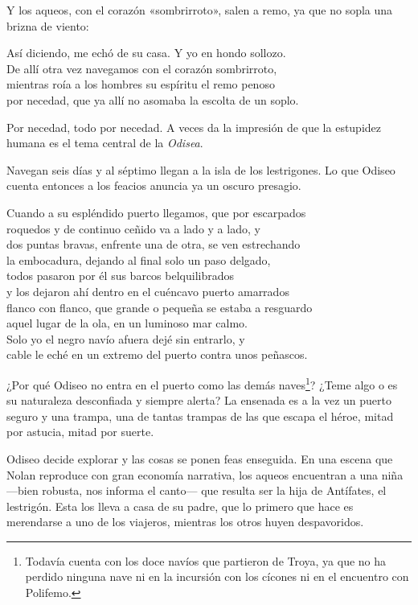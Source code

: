 Y los aqueos, con el corazón «sombrirroto», salen a remo, ya que no sopla una brizna de viento:

\begin{versocita}
Así diciendo, me echó de su casa. Y yo en hondo sollozo.\\
De allí otra vez navegamos con el corazón sombrirroto,\\
mientras roía a los hombres su espíritu el remo penoso\\
por necedad, que ya allí no asomaba la escolta de un soplo.
\end{versocita}

Por necedad, todo por necedad. A veces da la impresión de que la estupidez humana es el tema central de la \emph{Odisea}.

Navegan seis días y al séptimo llegan a la isla de los lestrigones. Lo que Odiseo cuenta entonces a los feacios anuncia ya un oscuro presagio.

\begin{versocita}
Cuando a su espléndido puerto llegamos, que por escarpados\\
roquedos y de continuo ceñido va a lado y a lado, y\\
dos puntas bravas, enfrente una de otra, se ven estrechando\\
la embocadura, dejando al final solo un paso delgado,\\
todos pasaron por él sus barcos belquilibrados\\
y los dejaron ahí dentro en el cuéncavo puerto amarrados\\
flanco con flanco, que grande o pequeña se estaba a resguardo\\
aquel lugar de la ola, en un luminoso mar calmo.\\
Solo yo el negro navío afuera dejé sin entrarlo, y\\
cable le eché en un extremo del puerto contra unos peñascos.
\end{versocita}

¿Por qué Odiseo no entra en el puerto como las demás naves\footnote{Todavía cuenta con los doce navíos que partieron de Troya, ya que no ha perdido ninguna nave ni en la incursión con los cícones ni en el encuentro con Polifemo.}? ¿Teme algo o es su naturaleza desconfiada y siempre alerta? La ensenada es a la vez un puerto seguro y una trampa, una de tantas trampas de las que escapa el héroe, mitad por astucia, mitad por suerte.

Odiseo decide explorar y las cosas se ponen feas enseguida. En una escena que Nolan reproduce con gran economía narrativa, los aqueos encuentran a una niña ---bien robusta, nos informa el canto--- que resulta ser la hija de Antífates, el lestrigón. Esta los lleva a casa de su padre, que lo primero que hace es merendarse a uno de los viajeros, mientras los otros huyen despavoridos.

